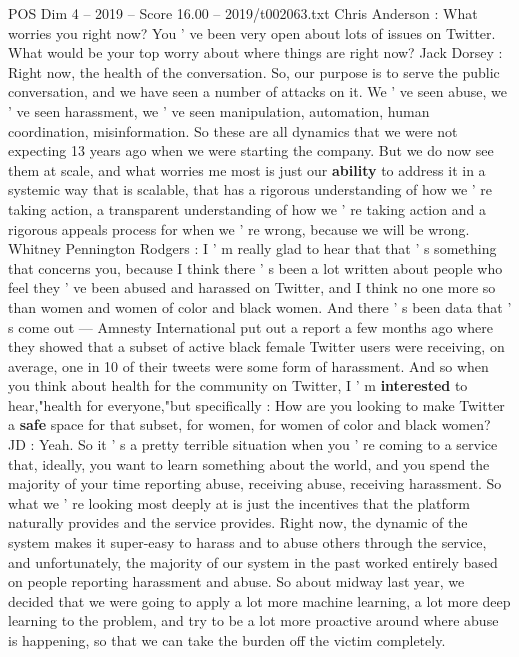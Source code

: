 \begin{textsample}{POS Dim 4 – 2019 – Score 16.00 – 2019/t002063.txt}  \label{ex:f4_pos_051}
Chris Anderson : What worries you right now?
You ' ve been very open about lots of issues on Twitter.
What would be your top worry about where things are right now?
Jack Dorsey : Right now, the health of the conversation.
So, our purpose is to serve the public conversation, and we have seen a number of attacks on it.
We ' ve seen abuse, we ' ve seen harassment, we ' ve seen manipulation, automation, human coordination, misinformation.
So these are all dynamics that we were not expecting 13 years ago when we were starting the company.
But we do now see them at scale, and what worries me most is just our \textbf{ability} to address it in a systemic way that is scalable, that has a rigorous understanding of how we ' re taking action, a transparent understanding of how we ' re taking action and a rigorous appeals process for when we ' re wrong, because we will be wrong.
Whitney Pennington Rodgers : I ' m really glad to hear that that ' s something that concerns you, because I think there ' s been a lot written about people who feel they ' ve been abused and harassed on Twitter, and I think no one more so than women and women of color and black women.
And there ' s been data that ' s come out — Amnesty International put out a report a few months ago where they showed that a subset of active black female Twitter users were receiving, on average, one in 10 of their tweets were some form of harassment.
And so when you think about health for the community on Twitter, I ' m \textbf{interested} to hear,"health for everyone,"but specifically : How are you looking to make Twitter a \textbf{safe} space for that subset, for women, for women of color and black women?
JD : Yeah.
So it ' s a pretty terrible situation when you ' re coming to a service that, ideally, you want to learn something about the world, and you spend the majority of your time reporting abuse, receiving abuse, receiving harassment.
So what we ' re looking most deeply at is just the incentives that the platform naturally provides and the service provides.
Right now, the dynamic of the system makes it super-easy to harass and to abuse others through the service, and unfortunately, the majority of our system in the past worked entirely based on people reporting harassment and abuse.
So about midway last year, we decided that we were going to apply a lot more machine learning, a lot more deep learning to the problem, and try to be a lot more proactive around where abuse is happening, so that we can take the burden off the victim completely.

\end{textsample}
